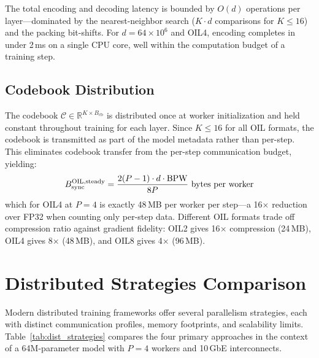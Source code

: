 The total encoding and decoding latency is bounded by $O(d)$ operations per layer---dominated by the nearest-neighbor search ($K \cdot d$ comparisons for $K \leq 16$) and the packing bit-shifts. For $d = 64 \times 10^6$ and OIL4, encoding completes in under 2\,ms on a single CPU core, well within the computation budget of a training step.

\subsection{Codebook Distribution}
\label{sec:oil_codebook_dist}

The codebook $\mathcal{C} \in \mathbb{R}^{K \times B_{\text{cb}}}$ is distributed once at worker initialization and held constant throughout training for each layer. Since $K \leq 16$ for all OIL formats, the codebook is transmitted as part of the model metadata rather than per-step. This eliminates codebook transfer from the per-step communication budget, yielding:
\[
B_{\text{sync}}^{\text{OIL,steady}} = \frac{2(P-1) \cdot d \cdot \textnormal{BPW}}{8P} \text{ bytes per worker}
\]
which for OIL4 at $P = 4$ is exactly 48\,MB per worker per step---a 16$\times$ reduction over FP32 when counting only per-step data. Different OIL formats trade off compression ratio against gradient fidelity: OIL2 gives 16$\times$ compression (24\,MB), OIL4 gives 8$\times$ (48\,MB), and OIL8 gives 4$\times$ (96\,MB).

\section{Distributed Strategies Comparison}
\label{sec:dist_strategies}

Modern distributed training frameworks offer several parallelism strategies, each with distinct communication profiles, memory footprints, and scalability limits. Table~\ref{tab:dist_strategies} compares the four primary approaches in the context of a 64M-parameter model with $P = 4$ workers and 10\,GbE interconnects.

